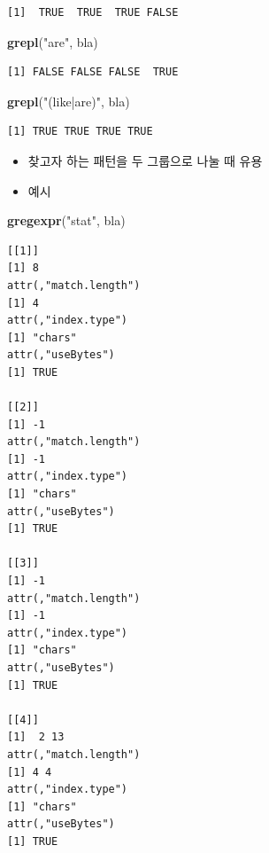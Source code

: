 \documentclass[
  11pt,
]{krantz}
\newenvironment{Shaded}{\begin{snugshade}}{\end{snugshade}}
\newcommand{\KeywordTok}[1]{\textcolor[rgb]{0.27,0.27,0.27}{\textbf{#1}}}
\newcommand{\NormalTok}[1]{#1}
\newcommand{\StringTok}[1]{\textcolor[rgb]{0.5,0.5,0.5}{#1}}
\providecommand{\tightlist}{%
  \setlength{\itemsep}{0pt}\setlength{\parskip}{0pt}}
\begin{document}
\begin{verbatim}
[1]  TRUE  TRUE  TRUE FALSE
\end{verbatim}

\begin{Shaded}
\begin{Highlighting}[]
\KeywordTok{grepl}\NormalTok{(}\StringTok{"are"}\NormalTok{, bla)}
\end{Highlighting}
\end{Shaded}

\begin{verbatim}
[1] FALSE FALSE FALSE  TRUE
\end{verbatim}

\begin{Shaded}
\begin{Highlighting}[]
\KeywordTok{grepl}\NormalTok{(}\StringTok{"(like|are)"}\NormalTok{, bla)}
\end{Highlighting}
\end{Shaded}

\begin{verbatim}
[1] TRUE TRUE TRUE TRUE
\end{verbatim}

\normalsize

\begin{itemize}
\tightlist
\item
  찾고자 하는 패턴을 두 그룹으로 나눌 때 유용
\item
  예시
\end{itemize}

\footnotesize

\begin{Shaded}
\begin{Highlighting}[]
\KeywordTok{gregexpr}\NormalTok{(}\StringTok{"stat"}\NormalTok{, bla) }
\end{Highlighting}
\end{Shaded}

\begin{verbatim}
[[1]]
[1] 8
attr(,"match.length")
[1] 4
attr(,"index.type")
[1] "chars"
attr(,"useBytes")
[1] TRUE

[[2]]
[1] -1
attr(,"match.length")
[1] -1
attr(,"index.type")
[1] "chars"
attr(,"useBytes")
[1] TRUE

[[3]]
[1] -1
attr(,"match.length")
[1] -1
attr(,"index.type")
[1] "chars"
attr(,"useBytes")
[1] TRUE

[[4]]
[1]  2 13
attr(,"match.length")
[1] 4 4
attr(,"index.type")
[1] "chars"
attr(,"useBytes")
[1] TRUE
\end{verbatim}
\end{document}
